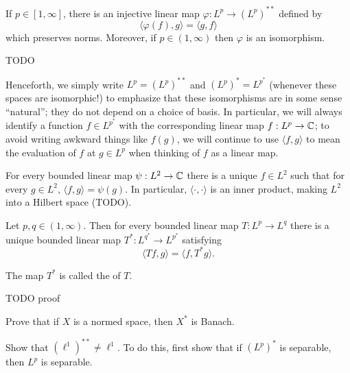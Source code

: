 \begin{corollary}
If $p \in [1, \infty]$, there is an injective linear map $\varphi: L^{p} \to (L^p)^{**}$ defined by
\[\langle \varphi(f), g\rangle = \langle g, f\rangle\]
which preserves norms. Moreover, if $p \in (1, \infty)$ then $\varphi$ is an isomorphism.
\end{corollary}
TODO

Henceforth, we simply write $L^{p} = (L^p)^{**}$ and $(L^p)^* = L^{p^*}$ (whenever these spaces are isomorphic!) to emphasize that these isomorphisms are in some sense ``natural''; they do not depend on a choice of basis.
In particular, we will always identify a function $f \in L^{p^*}$ with the corresponding linear map $f: L^{p} \to \mathbb{C}$; to avoid writing awkward things like $f(g)$, we will continue to use $\langle f, g\rangle$ to mean the evaluation of $f$ at $g \in L^p$ when thinking of $f$ as a linear map.

\begin{corollary}
For every bounded linear map $\psi: L^2 \to \mathbb{C}$ there is a unique $f \in L^2$ such that for every $g \in L^2$, $\langle f, g\rangle = \psi(g)$.
In particular, $\langle \cdot, \cdot \rangle$ is an inner product, making $L^2$ into a Hilbert space (TODO).
\end{corollary}

\begin{theorem}
Let $p, q \in (1, \infty)$. Then for every bounded linear map $T: L^{p} \to L^q$ there is a unique bounded linear map $T^*: L^{q^*} \to L^{p^*}$ satisfying
\[\langle Tf, g\rangle = \langle f, T^*g\rangle.\]
\end{theorem}
\begin{definition}
The map $T^*$ is called the  of $T$.
\end{definition}
TODO proof





\begin{exercise}\label{dual space is banach}
Prove that if $X$ is a normed space, then $X^*$ is Banach.
\end{exercise}

\begin{exercise}
Show that $(\ell^1)^{**} \neq \ell^1$.
To do this, first show that if $(L^p)^*$ is separable, then $L^p$ is separable.
\end{exercise}

